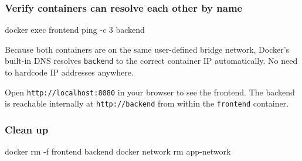 \documentclass[11pt,american,a4paper,openany]{book}
\newenvironment{Shaded}{}{}
\newcommand{\NormalTok}[1]{#1}
\begin{document}
\begin{Shaded}
\end{Shaded}

\subsubsection{Verify containers can resolve each other by
name}\label{verify-containers-can-resolve-each-other-by-name}

\begin{Shaded}
\begin{Highlighting}[]
\NormalTok{docker exec frontend ping {-}c 3 backend}
\end{Highlighting}
\end{Shaded}

Because both containers are on the same user-defined bridge network,
Docker's built-in DNS resolves \texttt{backend} to the correct container
IP automatically. No need to hardcode IP addresses anywhere.

Open \texttt{http://localhost:8080} in your browser to see the frontend.
The backend is reachable internally at \texttt{http://backend} from
within the \texttt{frontend} container.

\subsubsection{Clean up}\label{clean-up}

\begin{Shaded}
\begin{Highlighting}[]
\NormalTok{docker rm {-}f frontend backend}
\NormalTok{docker network rm app{-}network}
\end{Highlighting}
\end{Shaded}
\end{document}
